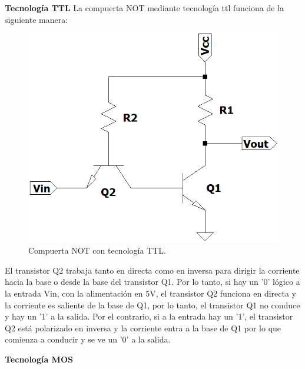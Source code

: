 \vspace{10mm}


{\large\textbf{Tecnolog\'ia TTL}}\newline
\noindent
La compuerta NOT mediante tecnolog\'ia ttl funciona de la siguiente manera:

\begin{figure}[H]
\center
    \includegraphics[scale = 0.55]{figs/ej1/not_ttl.png}
    \caption{Compuerta NOT con tecnolog\'ia TTL.}
\label{fig:ej1_ttl}
\end{figure}

\noindent\newline
El transistor Q2 trabaja tanto en directa como en inversa para dirigir la corriente hacia la base o desde la base del transistor Q1. Por lo tanto, si hay un '0' l\'ogico a la entrada Vin, con la alimentaci\'on en 5V, el transistor Q2 funciona en directa y la corriente es saliente de la base de Q1, por lo tanto, el transistor Q1 no conduce y hay un '1' a la salida. Por el contrario, si a la entrada hay un '1', el transistor Q2 est\'a polarizado en inversa y la corriente entra a la base de Q1 por lo que comienza a conducir y se ve un '0' a la salida.

\vspace{10mm}


{\large\textbf{Tecnolog\'ia MOS}}\newline
\noindent

